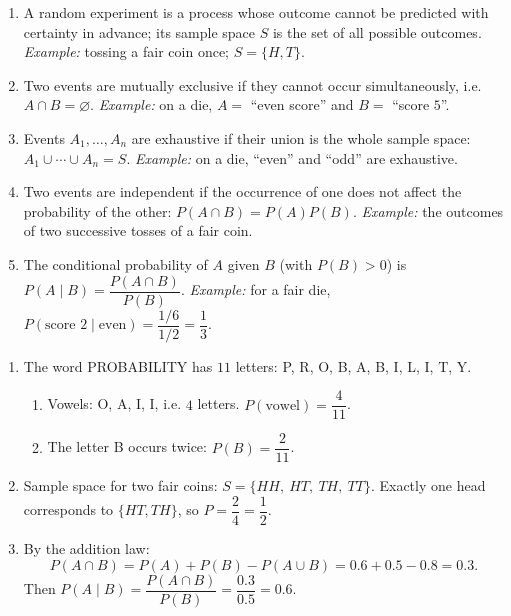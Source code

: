 \documentclass[11pt]{article}
\newcommand{\cle}[1]{{\popxbold\color{popdark}#1}}
\begin{document}
\begin{corrige}
\begin{enumerate}
\item A \cle{random experiment} is a process whose outcome cannot be predicted with certainty in advance; its \cle{sample space} $S$ is the set of all possible outcomes. \emph{Example:} tossing a fair coin once; $S=\{H,T\}$.
\item Two events are \cle{mutually exclusive} if they cannot occur simultaneously, i.e. $A\cap B=\varnothing$. \emph{Example:} on a die, $A=$ ``even score'' and $B=$ ``score $5$''.
\item Events $A_1,\dots,A_n$ are \cle{exhaustive} if their union is the whole sample space: $A_1\cup\cdots\cup A_n=S$. \emph{Example:} on a die, ``even'' and ``odd'' are exhaustive.
\item Two events are \cle{independent} if the occurrence of one does not affect the probability of the other: $P(A\cap B)=P(A)P(B)$. \emph{Example:} the outcomes of two successive tosses of a fair coin.
\item The \cle{conditional probability} of $A$ given $B$ (with $P(B)>0$) is $P(A\mid B)=\dfrac{P(A\cap B)}{P(B)}$. \emph{Example:} for a fair die, $P(\text{score }2\mid\text{even})=\dfrac{1/6}{1/2}=\dfrac13$.
\end{enumerate}
\end{corrige}

\begin{corrige}
\begin{enumerate}
\item The word PROBABILITY has $11$ letters: P, R, O, B, A, B, I, L, I, T, Y.
\begin{enumerate}
\item Vowels: O, A, I, I, i.e. $4$ letters. $P(\text{vowel})=\dfrac{4}{11}$.
\item The letter B occurs twice: $P(B)=\dfrac{2}{11}$.
\end{enumerate}
\item Sample space for two fair coins: $S=\{HH,\ HT,\ TH,\ TT\}$. Exactly one head corresponds to $\{HT,TH\}$, so $P=\dfrac{2}{4}=\dfrac{1}{2}$.
\item By the addition law:
\[P(A\cap B)=P(A)+P(B)-P(A\cup B)=0.6+0.5-0.8=0.3.\]
Then $P(A\mid B)=\dfrac{P(A\cap B)}{P(B)}=\dfrac{0.3}{0.5}=0.6$.
\end{enumerate}
\end{corrige}
\end{document}

